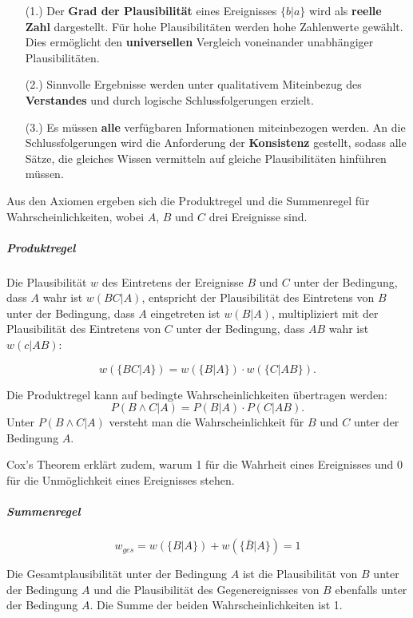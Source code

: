 \documentclass[]{dsadokumentation}
\begin{document}
{
\begin{itemize}
 \item[(1.)] Der \textbf{Grad der Plausibilität} eines Ereignisses $\{b|a\}$ wird als \textbf {reelle Zahl} dargestellt. Für hohe Plausibilitäten werden hohe Zahlenwerte gewählt. Dies ermöglicht den \textbf {universellen} Vergleich voneinander unabhängiger Plausibilitäten.
 
 \item[(2.)] Sinnvolle Ergebnisse werden unter qualitativem Miteinbezug des \textbf {Verstandes} und durch logische Schlussfolgerungen erzielt.
 \item[(3.)] Es müssen \textbf {alle }verfügbaren Informationen miteinbezogen werden. An die Schlussfolgerungen wird die Anforderung der \textbf {Konsistenz }gestellt, sodass alle Sätze, die gleiches Wissen vermitteln auf gleiche Plausibilitäten hinführen müssen.
\end{itemize}
}
Aus den Axiomen ergeben sich die Produktregel und die Summenregel für Wahrscheinlichkeiten, wobei $A$, $B$ und $C$ drei Ereignisse sind.

\subparagraph{Produktregel}

Die Plausibilität $w$ des Eintretens der Ereignisse $B$ und $C$ unter der Bedingung, dass $A$ wahr ist $w(BC|A)$, 
entspricht der Plausibilität des Eintretens von $B$ unter der Bedingung, dass $A$ eingetreten ist $w(B|A)$, 
multipliziert mit der Plausibilität des Eintretens von $C$ unter der Bedingung, dass $AB$ wahr ist $w(c|AB)$:

\begin {displaymath}
w(\{BC|A\})=w(\{B|A\})\cdot w(\{C|AB\}) .
\end{displaymath}

\noindent Die Produktregel kann auf bedingte Wahrscheinlichkeiten übertragen werden:
\begin {displaymath}
P(B \wedge C|A) = P(B|A)\cdot P(C|AB).
\end{displaymath}
Unter $P(B \wedge C|A)$ versteht man die Wahrscheinlichkeit für $B$ und $C$ unter der Bedingung $A$.

Cox's Theorem erklärt zudem, warum 1 für die Wahrheit eines Ereignisses und 0 für die Unmöglichkeit eines Ereignisses stehen.

\subparagraph{Summenregel}
\begin{displaymath}
w_{ges}=w(\{B|A\}) + w(\{\bar{B}|A\})= 1 
\end{displaymath}

Die Gesamtplausibilität unter der Bedingung $A$ ist die Plausibilität von $B$ unter der Bedingung $A$ 
und die Plausibilität des Gegenereignisses von $B$ ebenfalls unter der Bedingung $A$. Die Summe der beiden Wahrscheinlichkeiten ist 1.
\end{document}
